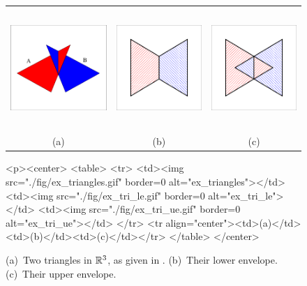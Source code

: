 \begin{figure}[t]
\begin{ccTexOnly}
  \begin{center}
  \begin{tabular}{ccc}
    \includegraphics[height=1.8in]{Envelope_3/fig/ex_triangles} &
    \includegraphics[height=1.8in]{Envelope_3/fig/ex_tri_le} &
    \includegraphics[height=1.8in]{Envelope_3/fig/ex_tri_ue} \\
    {\small (a)} & {\small (b)} & {\small (c)}
  \end{tabular}
  \end{center}
\end{ccTexOnly}
\begin{ccHtmlOnly}
  <p><center>
  <table>
  <tr>
  <td><img src="./fig/ex_triangles.gif" border=0 alt="ex_triangles"></td>
  <td><img src="./fig/ex_tri_le.gif" border=0 alt="ex_tri_le"></td>
  <td><img src="./fig/ex_tri_ue.gif" border=0 alt="ex_tri_ue"></td>
  </tr>
  <tr align="center"><td>(a)</td><td>(b)</td><td>(c)</td></tr>
  </table>
  </center>
\end{ccHtmlOnly}
\caption{(a)~Two triangles in $\mathbb{R}^3$, as given in
. (b)~Their lower envelope.
(c)~Their upper envelope.\label{env3_fig:ex_tri}}
\end{figure}

